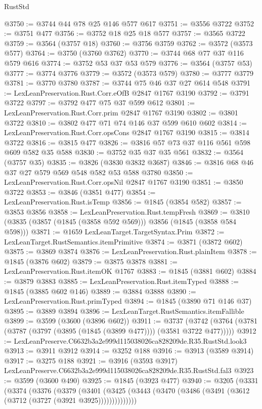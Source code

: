 \begin{lexlean}{RustStd}
\begin{coremodule}
@3750 := @3744 @44 @78 @25 @146 @577 @617
@3751 := @3556 @3722
@3752 := @3751 @477
@3756 := @3752 @18 @25 @18 @577
@3757 := @3565 @3722
@3759 := @3564 (@3757 @18)
@3760 := @3756 @3759
@3762 := @3572 (@3573 @577)
@3764 := @3750 (@3760 @3762)
@3770 := @3744 @68 @77 @37 @116 @579 @616
@3774 := @3752 @53 @37 @53 @579
@3776 := @3564 (@3757 @53)
@3777 := @3774 @3776
@3779 := @3572 (@3573 @579)
@3780 := @3777 @3779
@3781 := @3770 @3780
@3787 := @3744 @75 @46 @37 @27 @614 @548
@3791 := LexLeanPreservation.Rust.Corr.eOfB @2847 @1767 @3190
@3792 := @3791 @3722
@3797 := @3792 @477 @75 @37 @599 @612
@3801 := LexLeanPreservation.Rust.Corr.prim @2847 @1767 @3190
@3802 := @3801 @3722
@3810 := @3802 @477 @71 @74 @146 @37 @599 @610 @602
@3814 := LexLeanPreservation.Rust.Corr.opsCons @2847 @1767 @3190
@3815 := @3814 @3722
@3816 := @3815 @477
@3826 := @3816 @57 @73 @37 @116 @561 @598 @609 @582 @35 @588
@3830 := @3752 @35 @37 @35 @561
@3832 := @3564 (@3757 @35)
@3835 := @3826 (@3830 @3832 @3687)
@3846 := @3816 @68 @46 @37 @27 @579 @569 @548 @582 @53 @588 @3780
@3850 := LexLeanPreservation.Rust.Corr.opsNil @2847 @1767 @3190
@3851 := @3850 @3722
@3853 := @3846 (@3851 @477)
@3854 := LexLeanPreservation.Rust.isTemp
@3856 := @1845 (@3854 @582)
@3857 := @3853 @3856
@3858 := LexLeanPreservation.Rust.tempFresh
@3869 := @3810 (@3835 (@3857 (@1845 (@3858 @592 @569))) @3856 (@1845 (@3858 @584 @598)))
@3871 := @1659 LexLeanTarget.TargetSyntax.Prim
@3872 := LexLeanTarget.RustSemantics.itemPrimitive
@3874 := @3871 (@3872 @602)
@3875 := @3869 @3874
@3876 := LexLeanPreservation.Rust.plainItem
@3878 := @1845 (@3876 @602)
@3879 := @3875 @3878
@3881 := LexLeanPreservation.Rust.itemOK @1767
@3883 := @1845 (@3881 @602)
@3884 := @3879 @3883
@3885 := LexLeanPreservation.Rust.itemTyped
@3888 := @1845 (@3885 @602 @146)
@3889 := @3884 @3888
@3890 := LexLeanPreservation.Rust.primTyped
@3894 := @1845 (@3890 @71 @146 @37)
@3895 := @3889 @3894
@3896 := LexLeanTarget.RustSemantics.itemFallible
@3899 := @3599 (@3600 (@3896 @602))
@3911 := @3737
    (@3742 (@3764 (@3781 (@3787 (@3797 (@3895 (@1845 (@3899 @477)))) (@3581 @3722 @477)))))
@3912 := LexLeanPreserve.C6632b3a2e999d115038026ca828209de.R35.RustStd.look3
@3913 := @3911 @3912
@3914 := @3252 @188
@3916 := @3913 (@3589 @3914)
@3917 := @3275 @188
@3921 := @3916 (@3593 @3917) LexLeanPreserve.C6632b3a2e999d115038026ca828209de.R35.RustStd.fal3
@3923 := @3599 (@3600 @490)
@3925 := @1845 (@3923 @477)
@3940 := @3205
    (@3331
      (@3374
        (@3376
          (@3379
            (@3401
              (@3425 (@3443 (@3470 (@3486 (@3491 (@3612 (@3712 (@3727 (@3921 @3925))))))))))))))

\end{coremodule}
\end{lexlean}
